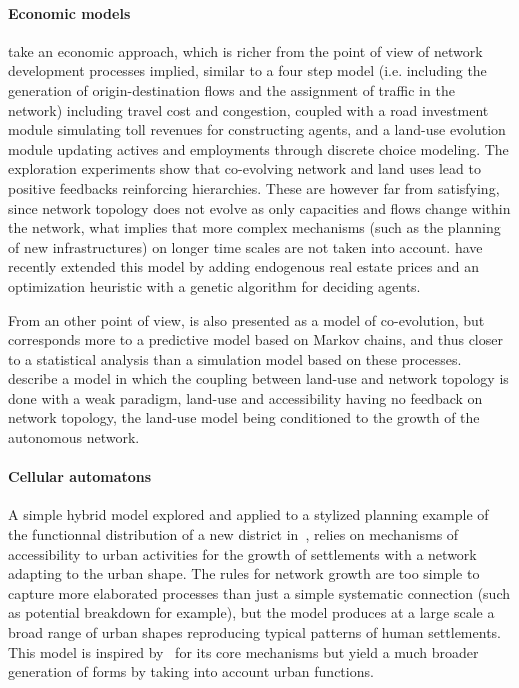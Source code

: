 \paragraph{Economic models}



\cite{levinson2007co} take an economic approach, which is richer from the point of view of network development processes implied, similar to a four step model (i.e. including the generation of origin-destination flows and the assignment of traffic in the network) including travel cost and congestion, coupled with a road investment module simulating toll revenues for constructing agents, and a land-use evolution module updating actives and employments through discrete choice modeling. The exploration experiments show that co-evolving network and land uses lead to positive feedbacks reinforcing hierarchies. These are however far from satisfying, since network topology does not evolve as only capacities and flows change within the network, what implies that more complex mechanisms (such as the planning of new infrastructures) on longer time scales are not taken into account. \cite{li2016integrated} have recently extended this model by adding endogenous real estate prices and an optimization heuristic with a genetic algorithm for deciding agents.


From an other point of view, \citep{levinson2005paving} is also presented as a model of co-evolution, but corresponds more to a predictive model based on Markov chains, and thus closer to a statistical analysis than a simulation model based on these processes. \cite{rui2011urban} describe a model in which the coupling between land-use and network topology is done with a weak paradigm, land-use and accessibility having no feedback on network topology, the land-use model being conditioned to the growth of the autonomous network.




\paragraph{Cellular automatons}


A simple hybrid model explored and applied to a stylized planning example of the functionnal distribution of a new district in~\citep{raimbault2014hybrid}, relies on mechanisms of accessibility to urban activities for the growth of settlements with a network adapting to the urban shape. The rules for network growth are too simple to capture more elaborated processes than just a simple systematic connection (such as potential breakdown for example), but the model produces at a large scale a broad range of urban shapes reproducing typical patterns of human settlements. This model is inspired by~\citep{moreno2012automate} for its core mechanisms but yield a much broader generation of forms by taking into account urban functions.


